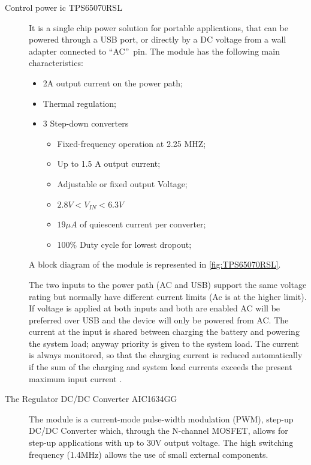 \documentclass[11pt,a4paper,titlepage]{article}
\begin{document}
				\begin{description}
				  \item [Control power \gls{ic} TPS65070RSL] It is a single chip power solution for portable applications, that can be powered through a USB port, or directly by a DC voltage from a wall adapter connected to \textquotedblleft AC\textquotedblright\ pin. The module has the following main characteristics:
						\begin{itemize}
							\item 2A output current on the power path;
							\item Thermal regulation;
							\item 3 Step-down converters
								\begin{itemize}
									\item Fixed-frequency operation at 2.25 MHZ;
									\item Up to 1.5 A output current;
									\item Adjustable or fixed output Voltage;
									\item $2.8V < V_{IN} < 6.3V$
									\item $19\mu A$ of quiescent current per converter;
									\item 100\% Duty cycle for lowest dropout;
								\end{itemize}
						\end{itemize}
				  A block diagram of the module is represented in \autoref{fig:TPS65070RSL}.

				  The two inputs to the power path (AC and USB) support the same voltage rating but normally have different current limits (Ac is at the higher limit). If voltage is applied at both inputs and both are enabled AC will be preferred over USB and the device will only be powered from AC. The current at the input is shared between charging the battery and powering the system load; anyway priority is given to the system load. The current is always monitored, so that the charging current is reduced automatically if the sum of the charging and system load currents exceeds the present maximum input current \cite{ICpower}.

				  \item[The Regulator DC/DC Converter AIC1634GG] The module is a current-mode pulse-width modulation (PWM), step-up DC/DC Converter which, through the N-channel MOSFET, allows for step-up applications with up to 30V output voltage. The high switching frequency (1.4MHz) allows the use of small external components.


\end{description}
\end{document}
